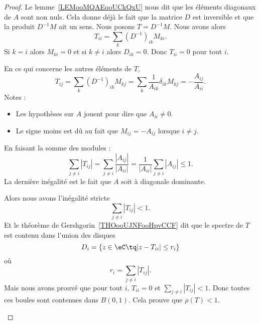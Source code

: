 \begin{proof}
	Le lemme~\ref{LEMooMQAEooUCkQxU} nous dit que les éléments diagonaux de \( A\) sont non nuls. Cela donne déjà le fait que la matrice \( D\) est inversible et que la produit \( D^{-1}M\) ait un sens. Nous posons \( T=D^{-1}M\). Nous avons alors
	\begin{equation}
		T_{ii}=\sum_k(D^{-1})_{ik}M_{ki}.
	\end{equation}
	Si \( k=i\) alors \( M_{ki}=0\) et si \( k\neq i\) alors \( D_{ik}=0\). Donc \( T_{ii}=0\) pour tout \( i\).

	En ce qui concerne les autres éléments de \( T\),
	\begin{equation}
		T_{ij}=\sum_k(D^{-1})_{ik}M_{kj}=\sum_k\frac{1}{ A_{ik} }\delta_{ik}M_{kj}=-\frac{ A_{ij} }{ A_{ii} }.
	\end{equation}
	Notes :
	\begin{itemize}
		\item
		      Les hypothèses sur \( A\) jouent pour dire que \( A_{ii}\neq 0\).
		\item
		      Le signe moins est dû au fait que \( M_{ij}=-A_{ij}\) lorsque \( i\neq j\).
	\end{itemize}
	En faisant la somme des modules :
	\begin{equation}
		\sum_{j\neq i}| T_{ij} |=\sum_{j\neq i}\frac{ | A_{ij} | }{ | A_{ii} | }=\frac{1}{ | A_{ii} | }\sum_{j\neq i}| A_{ij} |\leq 1.
	\end{equation}
	La dernière inégalité est le fait que \( A\) soit à diagonale dominante.

	\begin{subproof}
		Alors nous avons l'inégalité stricte
		\begin{equation}
			\sum_{j\neq i}| T_{ij} |<1.
		\end{equation}
		Et le théorème de Gershgorin~\ref{THOooUJNFooHpvCCF} dit que le spectre de \( T\) est contenu dans l'union des disques
		\begin{equation}
			D_i=\{ z\in \eC\tq | z-T_{ii} |\leq r_i \}
		\end{equation}
		où
		\begin{equation}
			r_i=\sum_{j\neq i}| T_{ij} |.
		\end{equation}
		Mais nous avons prouvé que pour tout \( i\), \( T_{ii}=0\) et \( \sum_{j\neq i}| T_{ij} |<1\). Donc toutes ces boules sont contenues dans \( B(0,1)\). Cela prouve que \( \rho(T)<1\).


\end{subproof}
\end{proof}
